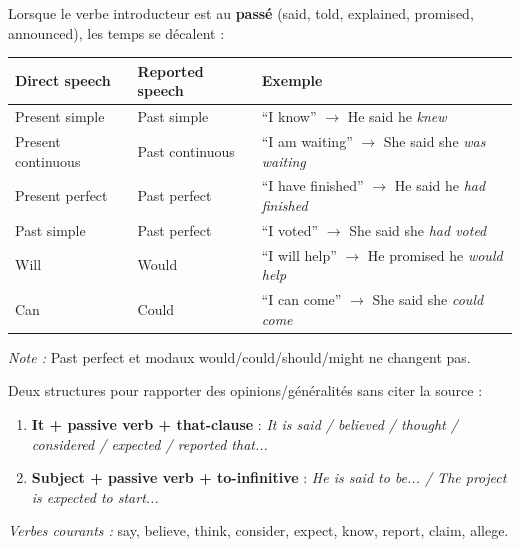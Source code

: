 \documentclass[11pt]{article}
\newcounter{popsec}
\newcounter{popsub}
\newcommand{\courssub}[1]{%
  \stepcounter{popsub}%
  \par\vspace{9pt}\noindent{\popxbold\fontsize{11.5}{13}\selectfont\color{popink}{\color{poporange}\thepopsec.\thepopsub}\hspace{6pt}#1}\par\nopagebreak\vspace{4pt}
}
\begin{document}
\begin{propriete}
Lorsque le verbe introducteur est au \textbf{passé} (said, told, explained, promised, announced), les temps se décalent :
\begin{center}
\begin{tabular}{|l|l|l|}\hline
\textbf{Direct speech} & \textbf{Reported speech} & \textbf{Exemple} \\ \hline
Present simple & Past simple & ``I know'' $\rightarrow$ He said he \emph{knew} \\
Present continuous & Past continuous & ``I am waiting'' $\rightarrow$ She said she \emph{was waiting} \\
Present perfect & Past perfect & ``I have finished'' $\rightarrow$ He said he \emph{had finished} \\
Past simple & Past perfect & ``I voted'' $\rightarrow$ She said she \emph{had voted} \\
Will & Would & ``I will help'' $\rightarrow$ He promised he \emph{would help} \\
Can & Could & ``I can come'' $\rightarrow$ She said she \emph{could come} \\ \hline
\end{tabular}
\end{center}
\emph{Note :} Past perfect et modaux would/could/should/might ne changent pas.
\end{propriete}

\begin{propriete}
Deux structures pour rapporter des opinions/généralités sans citer la source :
\begin{enumerate}
\item \textbf{It + passive verb + that-clause} : \emph{It is said / believed / thought / considered / expected / reported that...}
\item \textbf{Subject + passive verb + to-infinitive} : \emph{He is said to be... / The project is expected to start...}
\end{enumerate}
\emph{Verbes courants :} say, believe, think, consider, expect, know, report, claim, allege.
\end{propriete}

\courssub{Je m'entraîne}
\end{document}
